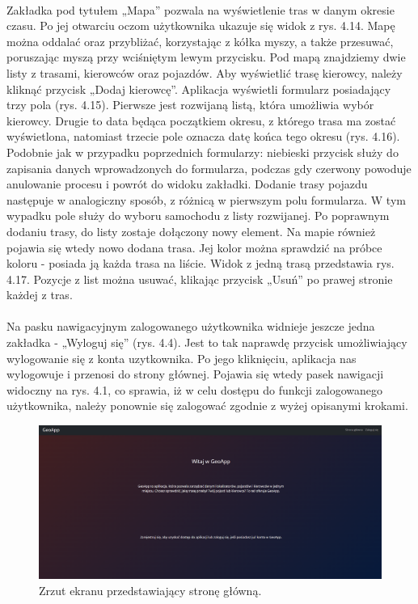 \paragraph{}
Zakładka pod tytułem „Mapa” pozwala na wyświetlenie tras w danym okresie czasu. Po jej otwarciu oczom użytkownika ukazuje się widok z rys. 4.14. Mapę można oddalać oraz przybliżać, korzystając z kółka myszy, a także przesuwać, poruszając myszą przy wciśniętym lewym przycisku. Pod mapą znajdziemy dwie listy z trasami, kierowców oraz pojazdów. Aby wyświetlić trasę kierowcy, należy kliknąć przycisk „Dodaj kierowcę”. Aplikacja wyświetli formularz posiadający trzy pola (rys. 4.15). Pierwsze jest rozwijaną listą, która umożliwia wybór kierowcy. Drugie to data będąca początkiem okresu, z którego trasa ma zostać wyświetlona, natomiast trzecie pole oznacza datę końca tego okresu (rys. 4.16). Podobnie jak w przypadku poprzednich formularzy: niebieski przycisk służy do zapisania danych wprowadzonych do formularza, podczas gdy czerwony powoduje anulowanie procesu i powrót do widoku zakładki. Dodanie trasy pojazdu następuje w analogiczny sposób, z różnicą w pierwszym polu formularza. W tym wypadku pole służy do wyboru samochodu z listy rozwijanej. Po poprawnym dodaniu trasy, do listy zostaje dołączony nowy element. Na mapie również pojawia się wtedy nowo dodana trasa. Jej kolor można sprawdzić na próbce koloru - posiada ją każda trasa na liście. Widok z jedną trasą przedstawia rys. 4.17. Pozycje z list można usuwać, klikając przycisk „Usuń” po prawej stronie każdej z tras.

\paragraph{}
Na pasku nawigacyjnym zalogowanego użytkownika widnieje jeszcze jedna zakładka - „Wyloguj się” (rys. 4.4). Jest to tak naprawdę przycisk umożliwiający wylogowanie się z konta uzytkownika. Po jego kliknięciu, aplikacja nas wylogowuje i przenosi do strony głównej. Pojawia się wtedy pasek nawigacji widoczny na rys. 4.1, co sprawia, iż w celu dostępu do funkcji zalogowanego użytkownika, należy ponownie się zalogować zgodnie z wyżej opisanymi krokami.

\begin{figure}
	\centering
	\includegraphics[width=1\textwidth]{./graf/home_page.png}
	\caption{Zrzut ekranu przedstawiający stronę główną.}
	\label{fig:4.1}
\end{figure}

